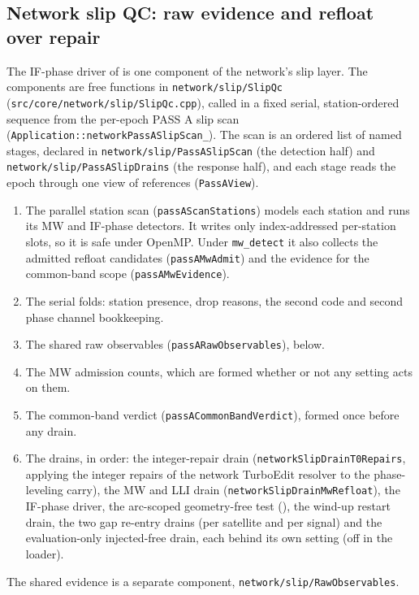 \documentclass[main.tex]{subfiles}
\begin{document}
\subsection{Network slip QC: raw evidence and refloat over repair}\label{sec:slip-network-qc}

The IF-phase driver of  is one component of the network's slip
layer.  The components are free functions in
\texttt{network/slip/SlipQc} (\texttt{src/core/network/slip/SlipQc.cpp}),
called in a fixed serial, station-ordered sequence from the per-epoch PASS A
slip scan (\texttt{Application::networkPassASlipScan\_}).  The scan is an
ordered list of named stages, declared in
\texttt{network/slip/PassASlipScan} (the detection half) and
\texttt{network/slip/PassASlipDrains} (the response half), and each stage
reads the epoch through one view of references (\texttt{PassAView}).
\begin{enumerate}[leftmargin=*, itemsep=0pt]
\item The parallel station scan (\texttt{passAScanStations}) models each
  station and runs its MW and IF-phase detectors.  It writes only
  index-addressed per-station slots, so it is safe under OpenMP.  Under
  \texttt{mw\_detect} it also collects the admitted refloat candidates
  (\texttt{passAMwAdmit}) and the evidence for the common-band scope
  (\texttt{passAMwEvidence}).
\item The serial folds: station presence, drop reasons, the second code and
  second phase channel bookkeeping.
\item The shared raw observables (\texttt{passARawObservables}), below.
\item The MW admission counts, which are formed whether or not any setting
  acts on them.
\item The common-band verdict (\texttt{passACommonBandVerdict}), formed once
  before any drain.
\item The drains, in order: the integer-repair drain
  (\texttt{networkSlipDrainT0Repairs}, applying the integer repairs of the
  network TurboEdit resolver to the phase-leveling carry), the MW and LLI
  drain (\texttt{networkSlipDrainMwRefloat}), the IF-phase driver, the
  arc-scoped geometry-free test (), the wind-up restart
  drain, the two gap re-entry drains (per satellite and per signal) and the
  evaluation-only injected-free drain, each behind its own setting (off in the loader).
\end{enumerate}
The shared evidence is a separate component,
\texttt{network/slip/RawObservables}.
\end{document}
